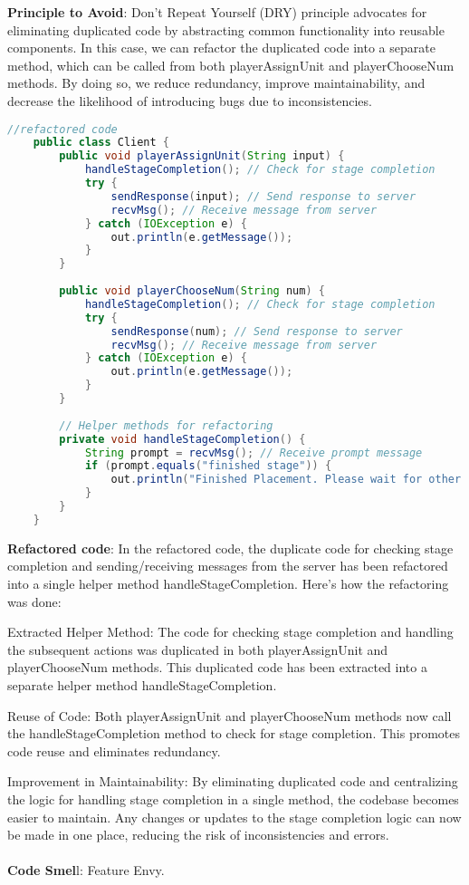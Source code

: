 \documentclass[12pt]{article}
\numberwithin{table}{section}
\begin{document}
\textbf{Principle to Avoid}: Don't Repeat Yourself (DRY) principle advocates for eliminating duplicated code by abstracting common functionality into reusable components. In this case, we can refactor the duplicated code into a separate method, which can be called from both playerAssignUnit and playerChooseNum methods. By doing so, we reduce redundancy, improve maintainability, and decrease the likelihood of introducing bugs due to inconsistencies.\begin{lstlisting}[language=Java]
	//refactored code
	public class Client {
		public void playerAssignUnit(String input) {
			handleStageCompletion(); // Check for stage completion
			try {
				sendResponse(input); // Send response to server
				recvMsg(); // Receive message from server
			} catch (IOException e) {
				out.println(e.getMessage());
			}
		}
		
		public void playerChooseNum(String num) {
			handleStageCompletion(); // Check for stage completion
			try {
				sendResponse(num); // Send response to server
				recvMsg(); // Receive message from server
			} catch (IOException e) {
				out.println(e.getMessage());
			}
		}
		
		// Helper methods for refactoring
		private void handleStageCompletion() {
			String prompt = recvMsg(); // Receive prompt message
			if (prompt.equals("finished stage")) {
				out.println("Finished Placement. Please wait for other players to place their students.");
			}
		}
	}
\end{lstlisting} 
\textbf{Refactored code}: In the refactored code, the duplicate code for checking stage completion and sending/receiving messages from the server has been refactored into a single helper method handleStageCompletion. Here's how the refactoring was done:

Extracted Helper Method:
The code for checking stage completion and handling the subsequent actions was duplicated in both playerAssignUnit and playerChooseNum methods. This duplicated code has been extracted into a separate helper method handleStageCompletion.

Reuse of Code:
Both playerAssignUnit and playerChooseNum methods now call the handleStageCompletion method to check for stage completion. This promotes code reuse and eliminates redundancy.

Improvement in Maintainability:
By eliminating duplicated code and centralizing the logic for handling stage completion in a single method, the codebase becomes easier to maintain. Any changes or updates to the stage completion logic can now be made in one place, reducing the risk of inconsistencies and errors.\\
\\
\textbf{Code Smel}l: Feature Envy.
\end{document}
